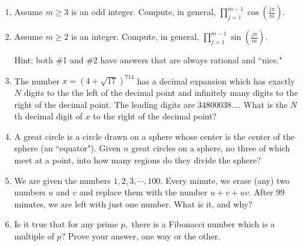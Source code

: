 \documentclass[9pt]{article}
\begin{document}
\begin{enumerate}
   \item Assume $m\ge 3$ is an odd  integer. Compute, in general,
         $\prod_{j=1}^{m-1}\cos\left(\frac{j\pi}m\right).$
   \item Assume $m\ge 2$ is an  integer. Compute, in general,
         $\prod_{j=1}^{m-1}\sin\left(\frac{j\pi}m\right).$

         Hint: both \#1 and \#2 have answers that are always rational and
         ``nice."
   \item The number $x=\left(4+\sqrt{17}\right)^{714}$ has a decimal expansion 
         which has exactly $N$ digits to the the left of the decimal point and 
         infinitely many digits to the right of the decimal point. The leading 
         digits are $34800038\dots.$ What is the $N$th decimal digit of $x$ to 
         the right of the decimal point?
   \item A great circle is a circle drawn on a sphere whose center is the center 
         of the sphere (an ``equator"). Given $n$ great circles on a sphere, no 
         three of which meet at a point, into how many regions do they divide
         the sphere?
   \item We are given the numbers $1,2,3,\cdots,100.$ Every minute, we erase
         (any) two numbers $u$ and $v$ and replace them with the number
         $u+v+uv.$ After 99 minutes, we are left with just one number. What is 
         it, and why?
   \item Is it true that for any prime $p,$ there is a Fibonacci number which is 
         a multiple of $p?$ Prove your answer, one way or the other.
\end{enumerate}
\end{document}
